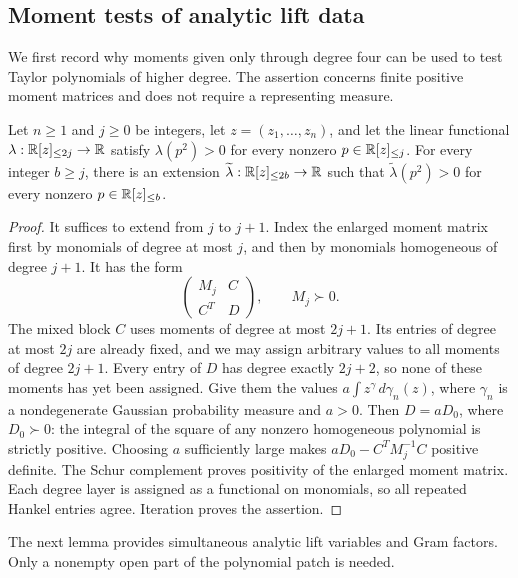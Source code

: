 \subsection{Moment tests of analytic lift data}

We first record why moments given only through degree four can be used to
test Taylor polynomials of higher degree.  The assertion concerns finite
positive moment matrices and does not require a representing measure.

\begin{lemma}
 \label{lem:positive-moment-extension}
Let $n\ge1$ and $j\ge0$ be integers, let $z=(z_1,\ldots,z_n)$, and let the
linear functional
$\lambda:\mathbb R[z]_{\le2j}\to\mathbb R$ satisfy $\lambda(p^2)>0$ for every
nonzero $p\in\mathbb R[z]_{\le j}$.  For every integer $b\ge j$, there is an
extension $\widetilde\lambda:\mathbb R[z]_{\le2b}\to\mathbb R$ such that
$\widetilde\lambda(p^2)>0$ for every nonzero
$p\in\mathbb R[z]_{\le b}$.
\end{lemma}

\begin{proof}
It suffices to extend from $j$ to $j+1$.  Index the enlarged moment matrix
first by monomials of degree at most $j$, and then by monomials homogeneous
of degree $j+1$.  It has the form
\[
 \begin{pmatrix}M_j&C\\C^T&D\end{pmatrix},\qquad M_j\succ0.
\]
The mixed block $C$ uses moments of degree at most $2j+1$.  Its entries
of degree at most $2j$ are already fixed, and we may assign arbitrary
values to all moments of degree $2j+1$.  Every entry of $D$ has degree
exactly $2j+2$, so none of these moments has yet been assigned.  Give them
the values $a\int z^\gamma\,d\gamma_n(z)$, where $\gamma_n$ is a
nondegenerate Gaussian probability measure and $a>0$.  Then $D=aD_0$,
where $D_0\succ0$: the integral of the square of any nonzero homogeneous
polynomial is strictly positive.  Choosing $a$ sufficiently large makes
$aD_0-C^TM_j^{-1}C$ positive definite.  The Schur complement proves
positivity of the enlarged moment matrix.  Each degree layer is assigned
as a functional on monomials, so all repeated Hankel entries agree.
Iteration proves the assertion.
\end{proof}

The next lemma provides simultaneous analytic lift variables and Gram
factors.  Only a nonempty open part of the polynomial patch is needed.

